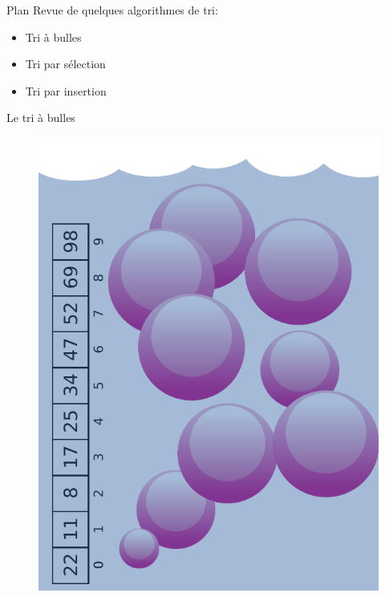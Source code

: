 \documentclass[12pt,a4paper]{beamer}
\begin{document}
\begin{frame}{Plan}
Revue de quelques algorithmes de tri:%
\begin{itemize}
\item Tri à bulles
\item Tri par sélection
\item Tri par insertion
\end{itemize}
\end{frame}

\begin{frame}{Le tri à bulles}

\begin{figure}
\centering
\includegraphics[scale=0.5]{figs/bubbles}
\end{figure}

\end{frame}
\end{document}
